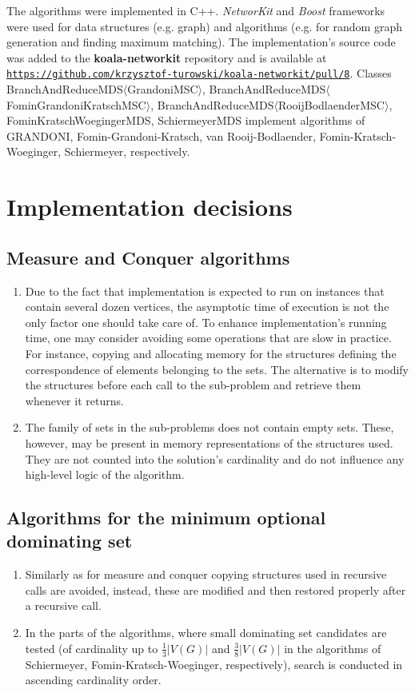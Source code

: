 The algorithms were implemented in C++. \textit{NetworKit} and \textit{Boost} frameworks were used for data structures (e.g. graph) and algorithms (e.g. for random graph generation and finding maximum matching). The implementation's source code was added to the \textbf{koala-networkit} repository and is available at \href{https://github.com/krzysztof-turowski/koala-networkit/pull/8}{\texttt{https://github.com/krzysztof-turowski/koala-networkit/pull/8}}. Classes BranchAndReduceMDS$\langle$GrandoniMSC$\rangle$, BranchAndReduceMDS$\langle$FominGrandoniKratschMSC$\rangle$, BranchAndReduceMDS$\langle$RooijBodlaenderMSC$\rangle$, FominKratschWoegingerMDS, SchiermeyerMDS implement algorithms of GRANDONI, Fomin-Grandoni-Kratsch, van Rooij-Bodlaender, Fomin-Kratsch-Woeginger, Schiermeyer, respectively.
\section{Implementation decisions}
\subsection{Measure and Conquer algorithms}
\begin{enumerate}
    \item Due to the fact that implementation is expected to run on instances that contain several dozen vertices, the asymptotic time of execution is not the only factor one should take care of. To enhance implementation's running time, one may consider avoiding some operations that are slow in practice. For instance, copying and allocating memory for the structures defining the correspondence of elements belonging to the sets. The alternative is to modify the structures before each call to the sub-problem and retrieve them whenever it returns.
    \item The family of sets in the sub-problems does not contain empty sets. These, however, may be present in memory representations of the structures used. They are not counted into the solution's cardinality and do not influence any high-level logic of the algorithm. 
\end{enumerate}
\subsection{Algorithms for the minimum optional dominating set}
\begin{enumerate}
    \item Similarly as for measure and conquer copying structures used in recursive calls are avoided, instead, these are modified and then restored properly after a recursive call.
    \item In the parts of the algorithms, where small dominating set candidates are tested (of cardinality up to $\frac{1}{3}|V(G)|$ and $\frac{3}{8}|V(G)|$ in the algorithms of Schiermeyer, Fomin-Kratsch-Woeginger, respectively), search is conducted in ascending cardinality order.
\end{enumerate}

